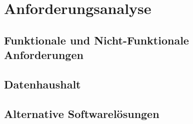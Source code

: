 \chapter{Anforderungsanalyse}
\section{Funktionale und Nicht-Funktionale Anforderungen}
\section{Datenhaushalt}
\section{Alternative Softwarelösungen}
